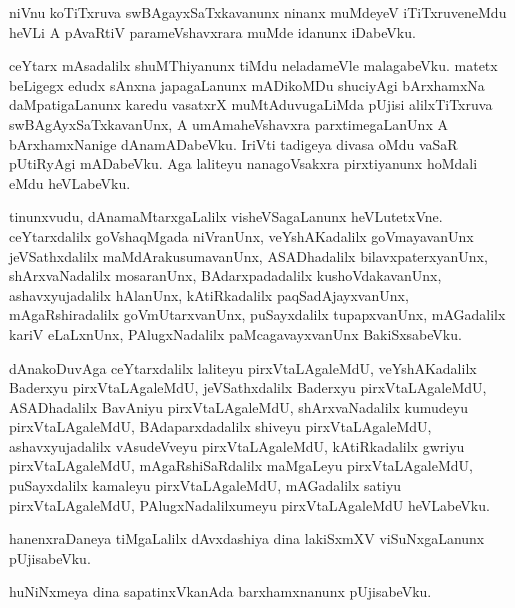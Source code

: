 \documentclass{article}
\begin{document}
\begin{mn}
niVnu  koTiTxruva  swBAgayxSaTxkavanunx  ninanx  muMdeyeV  iTiTxruveneMdu  heVLi  A  pAvaRtiV  parameVshavxrara  
muMde  idanunx  iDabeVku.
\end{mn}

\begin{mn}
ceYtarx  mAsadalilx  shuMThiyanunx  tiMdu  neladameVle  malagabeVku.  matetx  beLigegx  edudx  sAnxna  
japagaLanunx  mADikoMDu  shuciyAgi  bArxhamxNa  daMpatigaLanunx  karedu  vasatxrX  muMtAduvugaLiMda  
pUjisi  alilxTiTxruva  swBAgAyxSaTxkavanUnx,  A umAmaheVshavxra  parxtimegaLanUnx  A  bArxhamxNanige  
dAnamADabeVku.  IriVti  tadigeya  divasa  oMdu  vaSaR  pUtiRyAgi  mADabeVku.  Aga  laliteyu  nanagoVsakxra  
pirxtiyanunx  hoMdali  eMdu  heVLabeVku.
\end{mn}

\begin{mn}
tinunxvudu,  dAnamaMtarxgaLalilx  visheVSagaLanunx  heVLutetxVne.  ceYtarxdalilx  goVshaqMgada  niVranUnx,  
veYshAKadalilx  goVmayavanUnx  jeVSathxdalilx  maMdArakusumavanUnx,  ASADhadalilx  bilavxpaterxyanUnx,  
shArxvaNadalilx  mosaranUnx,  BAdarxpadadalilx  kushoVdakavanUnx,  ashavxyujadalilx  hAlanUnx,  kAtiRkadalilx  
paqSadAjayxvanUnx,  mAgaRshiradalilx  goVmUtarxvanUnx,  puSayxdalilx  tupapxvanUnx,  mAGadalilx  kariV  
eLaLxnUnx,  PAlugxNadalilx  paMcagavayxvanUnx  BakiSxsabeVku.
\end{mn}

\begin{mn}
dAnakoDuvAga  ceYtarxdalilx  laliteyu  pirxVtaLAgaleMdU,  veYshAKadalilx  Baderxyu  pirxVtaLAgaleMdU,  jeVSathxdalilx  
Baderxyu  pirxVtaLAgaleMdU,  ASADhadalilx  BavAniyu  pirxVtaLAgaleMdU,  shArxvaNadalilx  kumudeyu  pirxVtaLAgaleMdU,  
BAdaparxdadalilx  shiveyu  pirxVtaLAgaleMdU,  ashavxyujadalilx  vAsudeVveyu  pirxVtaLAgaleMdU,  kAtiRkadalilx  gwriyu  
pirxVtaLAgaleMdU,  mAgaRshiSaRdalilx  maMgaLeyu  pirxVtaLAgaleMdU,  puSayxdalilx  kamaleyu  pirxVtaLAgaleMdU,  mAGadalilx  
satiyu  pirxVtaLAgaleMdU,  PAlugxNadalilxumeyu  pirxVtaLAgaleMdU  heVLabeVku.
\end{mn}

\begin{mn}
hanenxraDaneya  tiMgaLalilx  dAvxdashiya  dina  lakiSxmXV  viSuNxgaLanunx  pUjisabeVku.
\end{mn}

\begin{mn}
huNiNxmeya  dina  sapatinxVkanAda  barxhamxnanunx  pUjisabeVku.
\end{mn}
\end{document}
